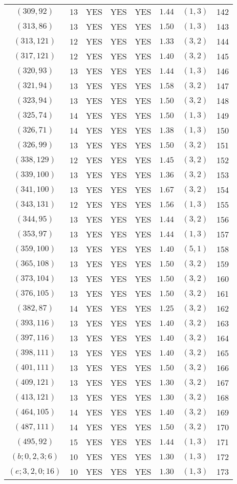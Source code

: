 \begin{longtable}{|c|c|c|c|c|c|c|c|}
$(309,92)$ & 13 & YES & YES & YES & $1.44$ & $(1,3)$ & 142\\
$(313,86)$ & 13 & YES & YES & YES & $1.50$ & $(1,3)$ & 143\\
$(313,121)$ & 12 & YES & YES & YES & $1.33$ & $(3,2)$ & 144\\
$(317,121)$ & 12 & YES & YES & YES & $1.40$ & $(3,2)$ & 145\\
$(320,93)$ & 13 & YES & YES & YES & $1.44$ & $(1,3)$ & 146\\
$(321,94)$ & 13 & YES & YES & YES & $1.58$ & $(3,2)$ & 147\\
$(323,94)$ & 13 & YES & YES & YES & $1.50$ & $(3,2)$ & 148\\
$(325,74)$ & 14 & YES & YES & YES & $1.50$ & $(1,3)$ & 149\\
$(326,71)$ & 14 & YES & YES & YES & $1.38$ & $(1,3)$ & 150\\
$(326,99)$ & 13 & YES & YES & YES & $1.50$ & $(3,2)$ & 151\\
$(338,129)$ & 12 & YES & YES & YES & $1.45$ & $(3,2)$ & 152\\
$(339,100)$ & 13 & YES & YES & YES & $1.36$ & $(3,2)$ & 153\\
$(341,100)$ & 13 & YES & YES & YES & $1.67$ & $(3,2)$ & 154\\
$(343,131)$ & 12 & YES & YES & YES & $1.56$ & $(1,3)$ & 155\\
$(344,95)$ & 13 & YES & YES & YES & $1.44$ & $(3,2)$ & 156\\
$(353,97)$ & 13 & YES & YES & YES & $1.44$ & $(1,3)$ & 157\\
$(359,100)$ & 13 & YES & YES & YES & $1.40$ & $(5,1)$ & 158\\
$(365,108)$ & 13 & YES & YES & YES & $1.50$ & $(3,2)$ & 159\\
$(373,104)$ & 13 & YES & YES & YES & $1.50$ & $(3,2)$ & 160\\
$(376,105)$ & 13 & YES & YES & YES & $1.50$ & $(3,2)$ & 161\\
$(382,87)$ & 14 & YES & YES & YES & $1.25$ & $(3,2)$ & 162\\
$(393,116)$ & 13 & YES & YES & YES & $1.40$ & $(3,2)$ & 163\\
$(397,116)$ & 13 & YES & YES & YES & $1.40$ & $(3,2)$ & 164\\
$(398,111)$ & 13 & YES & YES & YES & $1.40$ & $(3,2)$ & 165\\
$(401,111)$ & 13 & YES & YES & YES & $1.50$ & $(3,2)$ & 166\\
$(409,121)$ & 13 & YES & YES & YES & $1.30$ & $(3,2)$ & 167\\
$(413,121)$ & 13 & YES & YES & YES & $1.30$ & $(3,2)$ & 168\\
$(464,105)$ & 14 & YES & YES & YES & $1.40$ & $(3,2)$ & 169\\
$(487,111)$ & 14 & YES & YES & YES & $1.50$ & $(3,2)$ & 170\\
$(495,92)$ & 15 & YES & YES & YES & $1.44$ & $(1,3)$ & 171\\
$(b;0,2,3;6)$ & 10 & YES & YES & YES & $1.30$ & $(1,3)$ & 172\\
$(e;3,2,0;16)$ & 10 & YES & YES & YES & $1.30$ & $(1,3)$ & 173
\end{longtable}
